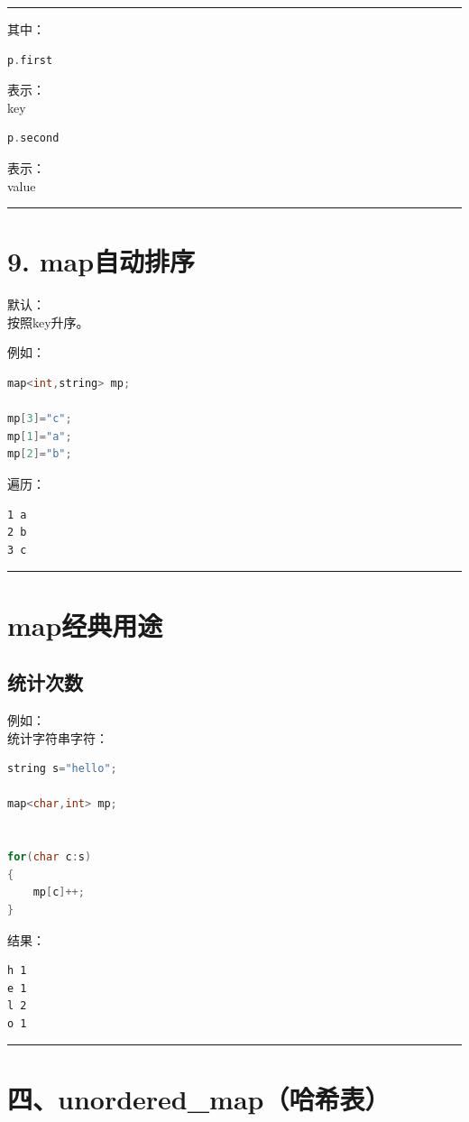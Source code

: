 \documentclass[10pt,twocolumn]{extarticle}
\begin{document}
\noindent\rule{\linewidth}{0.4pt}

其中：
\begin{lstlisting}[language=C++]
p.first
\end{lstlisting}
表示：\\
key

\begin{lstlisting}[language=C++]
p.second
\end{lstlisting}
表示：\\
value

\noindent\rule{\linewidth}{0.4pt}

\section{9. map自动排序}

默认：\\
按照key升序。

例如：
\begin{lstlisting}[language=C++]
map<int,string> mp;

mp[3]="c";
mp[1]="a";
mp[2]="b";
\end{lstlisting}
遍历：
\begin{lstlisting}
1 a
2 b
3 c
\end{lstlisting}

\noindent\rule{\linewidth}{0.4pt}

\section{map经典用途}

\subsection{统计次数}
例如：\\
统计字符串字符：
\begin{lstlisting}[language=C++]
string s="hello";

map<char,int> mp;


for(char c:s)
{
    mp[c]++;
}
\end{lstlisting}
结果：
\begin{lstlisting}
h 1
e 1
l 2
o 1
\end{lstlisting}

\noindent\rule{\linewidth}{0.4pt}

\section{四、unordered\_map（哈希表）}
\end{document}

